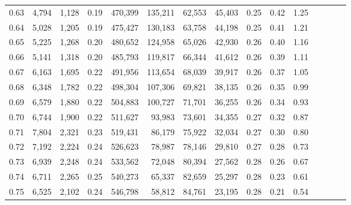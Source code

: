 \begin{tabular}{rrrcrrrrrrrrrrr}
0.63 &   4,794 &  1,128 &                                       0.19 &  470,399 &  135,211 &   62,553 &   45,403 &  0.25 &  0.42 &                         1.25 \\
0.64 &   5,028 &  1,205 &                                       0.19 &  475,427 &  130,183 &   63,758 &   44,198 &  0.25 &  0.41 &                         1.21 \\
0.65 &   5,225 &  1,268 &                                       0.20 &  480,652 &  124,958 &   65,026 &   42,930 &  0.26 &  0.40 &                         1.16 \\
0.66 &   5,141 &  1,318 &                                       0.20 &  485,793 &  119,817 &   66,344 &   41,612 &  0.26 &  0.39 &                         1.11 \\
0.67 &   6,163 &  1,695 &                                       0.22 &  491,956 &  113,654 &   68,039 &   39,917 &  0.26 &  0.37 &                         1.05 \\
0.68 &   6,348 &  1,782 &                                       0.22 &  498,304 &  107,306 &   69,821 &   38,135 &  0.26 &  0.35 &                         0.99 \\
0.69 &   6,579 &  1,880 &                                       0.22 &  504,883 &  100,727 &   71,701 &   36,255 &  0.26 &  0.34 &                         0.93 \\
0.70 &   6,744 &  1,900 &                                       0.22 &  511,627 &   93,983 &   73,601 &   34,355 &  0.27 &  0.32 &                         0.87 \\
0.71 &   7,804 &  2,321 &                                       0.23 &  519,431 &   86,179 &   75,922 &   32,034 &  0.27 &  0.30 &                         0.80 \\
0.72 &   7,192 &  2,224 &                                       0.24 &  526,623 &   78,987 &   78,146 &   29,810 &  0.27 &  0.28 &                         0.73 \\
0.73 &   6,939 &  2,248 &                                       0.24 &  533,562 &   72,048 &   80,394 &   27,562 &  0.28 &  0.26 &                         0.67 \\
0.74 &   6,711 &  2,265 &                                       0.25 &  540,273 &   65,337 &   82,659 &   25,297 &  0.28 &  0.23 &                         0.61 \\
0.75 &   6,525 &  2,102 &                                       0.24 &  546,798 &   58,812 &   84,761 &   23,195 &  0.28 &  0.21 &                         0.54 \\

\end{tabular}
